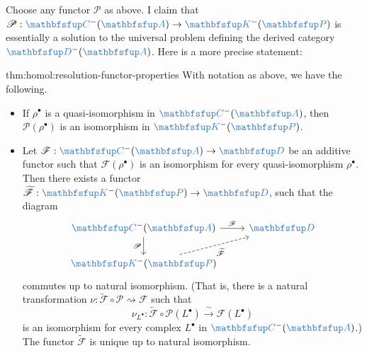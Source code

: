 Choose any functor $\mathscr{P}$ as above. I claim that
$\mathscr{P} : \categ{C}^-(\categ{A}) \to \categ{K}^-(\categ{P})$ is
essentially a solution to the universal problem defining the derived
category $\categ{D}^-(\categ{A})$. Here is a more precise statement:
\begin{thm}{}{thm:homol:resolution-functor-properties}
  With notation as above, we have the following.
  \begin{itemize}
  \item If $\rho^\bullet$ is a quasi-isomorphism in
    $\categ{C}^-(\categ{A})$, then $\mathscr{P}(\rho^\bullet)$ is an
    isomorphism in $\categ{K}^-(\categ{P})$.
  \item Let $\mathscr{F} : \categ{C}^-(\categ{A}) \to \categ{D}$ be an
    additive functor such that $\mathscr{F}(\rho^\bullet)$ is an
    isomorphism for every quasi-isomorphism $\rho^\bullet$. Then there
    exists a functor
    $\widetilde{\mathscr{F}} : \categ{K}^-( \categ{P}) \to \categ{D}$,
    such that the diagram
    \[\begin{tikzcd}
        \categ{C}^-(\categ{A}) \arrow[r, "\mathscr{F}"]
        \arrow[d, "\mathscr{P}"'] & \categ{D} \\
        \categ{K}^-(\categ{P}) \arrow[ur, dashed,
        "\widetilde{\mathscr{F}}"']
      \end{tikzcd}\] commutes up to natural isomorphism. (That is,
    there is a natural transformation
    $\nu : \widetilde{\mathscr{F}} \circ \mathscr{P} \rightsquigarrow
    \mathscr{F}$ such that
    \[
      \nu_{L^\bullet} : \widetilde{\mathscr{F}} \circ \mathscr{P}
      (L^\bullet) \xrightarrow{\ \sim\ } \mathscr{F}(L^\bullet)
    \]
    is an isomorphism for every complex $L^\bullet$ in
    $\categ{C}^-(\categ{A})$.) The functor $\widetilde{\mathscr{F}}$
    is unique up to natural isomorphism.
  \end{itemize}
\end{thm}

